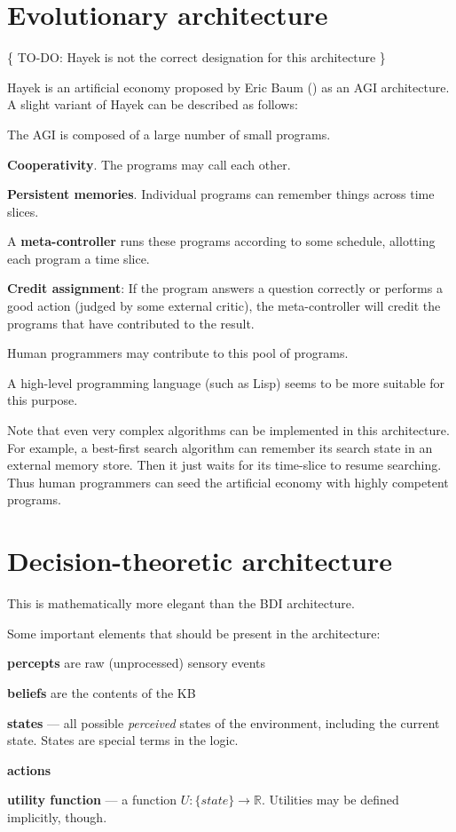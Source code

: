 \section{Evolutionary architecture}

\{ TO-DO:  Hayek is not the correct designation for this architecture \}

Hayek is an artificial economy proposed by Eric Baum (\citep*{Baum2004}) as an AGI architecture.  A slight variant of Hayek can be described as follows:

\begin{compactenum-}
\item The AGI is composed of a large number of small programs.
\item \textbf{Cooperativity}.  The programs may call each other.
\item \textbf{Persistent memories}.  Individual programs can remember things across time slices.
\item A \textbf{meta-controller} runs these programs according to some schedule, allotting each program a time slice.
\item \textbf{Credit assignment}:  If the program answers a question correctly or performs a good action (judged by some external critic), the meta-controller will credit the programs that have contributed to the result.
\item Human programmers may contribute to this pool of programs.
\end{compactenum-}

A high-level programming language (such as Lisp) seems to be more suitable for this purpose.

Note that even very complex algorithms can be implemented in this architecture.  For example, a best-first search algorithm can remember its search state in an external memory store.  Then it just waits for its time-slice to resume searching.  Thus human programmers can seed the artificial economy with highly competent programs.

\section{Decision-theoretic architecture}

This is mathematically more elegant than the BDI architecture.

Some important elements that should be present in the architecture:
\begin{compactenum-}
\item  \textbf{percepts} are raw (unprocessed) sensory events
\item  \textbf{beliefs} are the contents of the KB
\item  \textbf{states} --- all possible \textit{perceived} states of the environment, including the current state.  States are special terms in the logic.
\item  \textbf{actions}
\item  \textbf{utility function} --- a function $U: \{state\} \rightarrow \mathbb{R}$.  Utilities may be defined implicitly, though.
\end{compactenum-}

